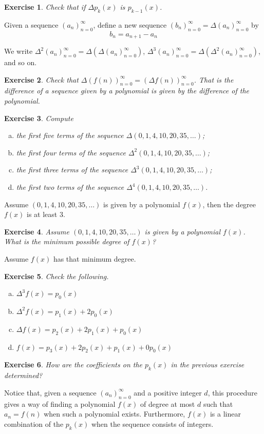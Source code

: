 \documentclass[12pt]{article}
\theoremstyle{plain}
\newtheorem{ex}{Exercise}
\begin{document}
\begin{ex}
  Check that if $\Delta p_k(x)$ is $p_{k-1}(x)$.
\end{ex}

Given a sequence $(a_n)_{n=0}^\infty$, define a new sequence $(b_n)_{n=0}^\infty=\Delta(a_n)_{n=0}^\infty$ by
\[
  b_n=a_{n+1}-a_n
\]

We write $\Delta^2(a_n)_{n=0}^\infty=\Delta(\Delta(a_n)_{n=0}^\infty)$, $\Delta^3(a_n)_{n=0}^\infty=\Delta(\Delta^2(a_n)_{n=0}^\infty)$, and so on.

\begin{ex}
  Check that $\Delta(f(n))_{n=0}^\infty=(\Delta f(n))_{n=0}^\infty$. That is the difference of a sequence given by a polynomial is given by the difference of the polynomial.
\end{ex}

\begin{ex}
  Compute
  \begin{enumerate}[(a)]
    \item the first five terms of the sequence $\Delta(0,1,4,10,20,35,\ldots)$;
    \item the first four terms of the sequence $\Delta^2(0,1,4,10,20,35,\ldots)$;
    \item the first three terms of the sequence $\Delta^3(0,1,4,10,20,35,\ldots)$;
    \item the first two terms of the sequence $\Delta^4(0,1,4,10,20,35,\ldots)$.
  \end{enumerate}
\end{ex}

Assume $(0,1,4,10,20,35,\ldots)$ is given by a polynomial $f(x)$, then the degree $f(x)$ is at least $3$.

\begin{ex}
  Assume $(0,1,4,10,20,35,\ldots)$ is given by a polynomial $f(x)$. What is the minimum possible degree of $f(x)$?
\end{ex}

Assume $f(x)$ has that minimum degree.

\begin{ex}
  Check the following.
  \begin{enumerate}[(a)]
    \item $\Delta^3f(x)=p_0(x)$
    \item $\Delta^2f(x)=p_1(x)+2p_0(x)$
    \item $\Delta f(x)=p_2(x)+2p_1(x)+p_0(x)$
    \item $f(x)=p_3(x)+2p_2(x)+p_1(x)+0p_0(x)$
  \end{enumerate}
\end{ex}

\begin{ex}
  How are the coefficients on the $p_k(x)$ in the previous exercise determined?
\end{ex}

Notice that, given a sequence $(a_n)_{n=0}^\infty$ and a positive integer $d$, this procedure gives a way of finding a polynomial $f(x)$ of degree at most $d$ such that $a_n=f(n)$ when such a polynomial exists. Furthermore, $f(x)$ is a linear combination of the $p_k(x)$ when the sequence consists of integers.
\end{document}
